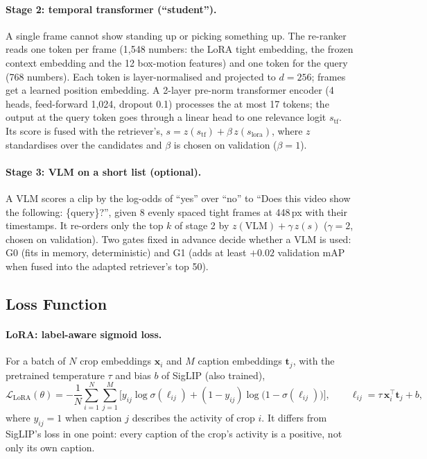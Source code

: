 \documentclass[11pt,a4paper]{article}
\begin{document}
\paragraph{Stage 2: temporal transformer (``student'').} A single frame cannot show standing up or picking something
up. The re-ranker reads one token per frame (1,548 numbers: the LoRA tight embedding, the frozen context embedding
and the 12 box-motion features) and one token for the query (768 numbers). Each token is layer-normalised and
projected to $d=256$; frames get a learned position embedding. A 2-layer pre-norm transformer encoder (4 heads,
feed-forward 1,024, dropout 0.1) processes the at most 17 tokens; the output at the query token goes through a
linear head to one relevance logit $s_{\mathrm{tf}}$. Its score is fused with the retriever's,
$s = z(s_{\mathrm{tf}}) + \beta\,z(s_{\mathrm{lora}})$, where $z$ standardises over the candidates and $\beta$
is chosen on validation ($\beta=1$).

\paragraph{Stage 3: VLM on a short list (optional).} A VLM scores a clip by the log-odds of ``yes'' over ``no'' to
``Does this video show the following: \{query\}?'', given 8 evenly spaced tight frames at 448\,px with their
timestamps. It re-orders only the top $k$ of stage 2 by $z(\mathrm{VLM}) + \gamma\, z(s)$ ($\gamma=2$, chosen on
validation). Two gates fixed in advance decide whether a VLM is used: G0 (fits in memory, deterministic) and G1
(adds at least $+0.02$ validation mAP when fused into the adapted retriever's top 50).

\subsection{Loss Function}
\paragraph{LoRA: label-aware sigmoid loss.} For a batch of $N$ crop embeddings $\mathbf{x}_i$ and $M$ caption
embeddings $\mathbf{t}_j$, with the pretrained temperature $\tau$ and bias $b$ of SigLIP (also trained),
\begin{equation}
\mathcal{L}_{\mathrm{LoRA}}(\theta) = -\frac{1}{N}\sum_{i=1}^{N}\sum_{j=1}^{M}
\Big[ y_{ij}\log\sigma(\ell_{ij}) + (1-y_{ij})\log\big(1-\sigma(\ell_{ij})\big) \Big],
\qquad \ell_{ij} = \tau\,\mathbf{x}_i^{\top}\mathbf{t}_j + b ,
\end{equation}
where $y_{ij}=1$ when caption $j$ describes the activity of crop $i$. It differs from SigLIP's loss in one point:
every caption of the crop's activity is a positive, not only its own caption.
\end{document}

